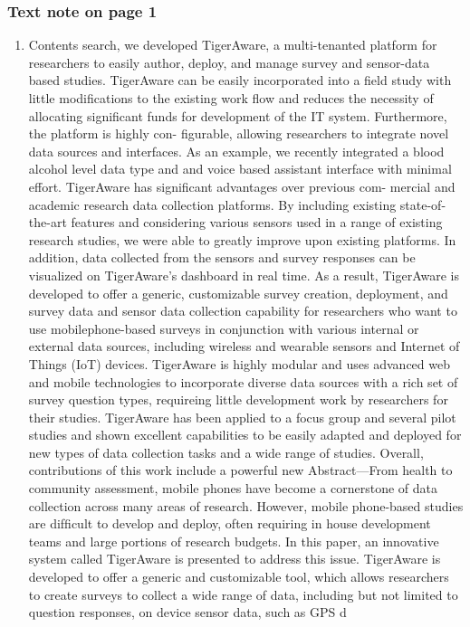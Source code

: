 \documentclass[11pt]{article}
\begin{document}
\subsubsection{Text note on page 1}
\label{sec:org6b63fae}
\begin{enumerate}
\item Contents
\label{sec:org03ae06c}
search, we developed TigerAware, a multi-tenanted platform
for researchers to easily author, deploy, and manage survey
and sensor-data based studies.
TigerAware can be easily incorporated into a ﬁeld study
with little modiﬁcations to the existing work ﬂow and reduces
the necessity of allocating signiﬁcant funds for development
of the IT system. Furthermore, the platform is highly con-
ﬁgurable, allowing researchers to integrate novel data sources
and interfaces. As an example, we recently integrated a blood
alcohol level data type and and voice based assistant interface
with minimal effort.
TigerAware has signiﬁcant advantages over previous com-
mercial and academic research data collection platforms. By
including existing state-of-the-art features and considering
various sensors used in a range of existing research studies,
we were able to greatly improve upon existing platforms. In
addition, data collected from the sensors and survey responses
can be visualized on TigerAware’s dashboard in real time.
As a result, TigerAware is developed to offer a generic,
customizable survey creation, deployment, and survey data
and sensor data collection capability for researchers who
want to use mobilephone-based surveys in conjunction with
various internal or external data sources, including wireless
and wearable sensors and Internet of Things (IoT) devices.
TigerAware is highly modular and uses advanced web and
mobile technologies to incorporate diverse data sources with a
rich set of survey question types, requireing little development
work by researchers for their studies. TigerAware has been
applied to a focus group and several pilot studies and shown
excellent capabilities to be easily adapted and deployed for
new types of data collection tasks and a wide range of studies.
Overall, contributions of this work include a powerful new
Abstract—From health to community assessment, mobile
phones have become a cornerstone of data collection across
many areas of research. However, mobile phone-based studies
are difﬁcult to develop and deploy, often requiring in house
development teams and large portions of research budgets. In
this paper, an innovative system called TigerAware is presented
to address this issue. TigerAware is developed to offer a generic
and customizable tool, which allows researchers to create surveys
to collect a wide range of data, including but not limited to
question responses, on device sensor data, such as GPS d
\end{enumerate}
\end{document}
